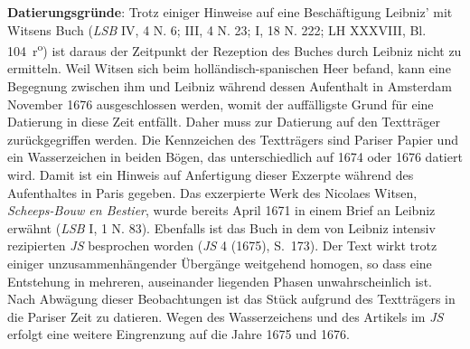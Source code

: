         \begin{ledgroup}
        \footnotesize 
        \pstart
      \noindent\footnotesize{\textbf{Datierungsgr\"{u}nde}: Trotz einiger Hinweise auf eine Besch\"{a}ftigung Leibniz' mit Witsens Buch (\textit{LSB} IV, 4 N. 6; III, 4 N. 23; I, 18 N. 222; LH XXXVIII, Bl. 104~r\textsuperscript{o}) ist daraus der Zeitpunkt der Rezeption des Buches durch Leibniz  nicht zu ermitteln. Weil Witsen sich beim holl\"{a}n\-disch-spanischen Heer befand, kann eine Begegnung zwischen ihm und Leibniz w\"{a}hrend dessen Aufenthalt in Amsterdam November 1676 ausgeschlossen werden, womit der auff\"{a}lligste Grund f\"{u}r eine Datierung in diese Zeit entf\"{a}llt. Daher muss zur Datierung auf den Texttr\"{a}ger zur\"{u}ckgegriffen werden. Die Kennzeichen des Texttr\"{a}gers sind Pariser Papier und ein Wasserzeichen in beiden B\"{o}gen, das unterschiedlich auf 1674 oder 1676 datiert wird. Damit ist ein Hinweis auf Anfertigung dieser Exzerpte w\"{a}hrend des Aufenthaltes in Paris gegeben. Das exzerpierte Werk des Nicolaes Witsen, \cite{00153}\textit{Scheeps-Bouw en Bestier}, wurde bereits April 1671 in einem Brief an Leibniz erw\"{a}hnt (\textit{LSB} I, 1 N. 83). Ebenfalls ist das Buch in dem von Leibniz intensiv rezipierten \textit{JS} besprochen worden (\cite{00274}\textit{JS} 4 (1675), S.~173). Der Text wirkt trotz einiger unzusammen\-h\"{a}ngender \"{U}berg\"{a}nge weitgehend homogen, so dass eine Entstehung in mehreren, auseinander liegenden Phasen unwahrscheinlich ist. Nach Abw\"{a}gung dieser Beobachtungen ist das St\"{u}ck aufgrund des Texttr\"{a}gers in die Pariser Zeit zu datieren. Wegen des Wasserzeichens und des Artikels im \textit{JS} erfolgt eine weitere Eingrenzung auf die Jahre 1675 und 1676.}
        \pend
        \end{ledgroup}
      
